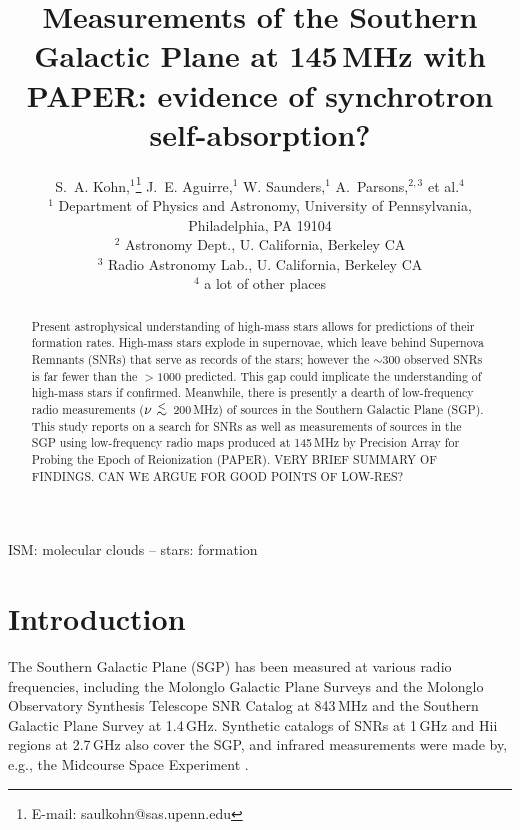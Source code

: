\documentclass[useAMS,usenatbib]{mn2e}
\title[The SGP at 145\,MHz with PAPER]{Measurements of the Southern Galactic Plane at 145\,MHz with PAPER: evidence of synchrotron self-absorption?}
\author[S. A. Kohn et al.]{S.~A. Kohn,$^{1}$\thanks{E-mail: saulkohn@sas.upenn.edu} J.~E. Aguirre,$^{1}$ W. Saunders,$^{1}$
A.~Parsons,$^{2,3}$
\newauthor et al.$^4$\\
$^{1}$ Department of Physics and Astronomy, University of Pennsylvania, Philadelphia, PA 19104\\
$^{2}$ Astronomy Dept., U. California, Berkeley CA\\
$^{3}$ Radio Astronomy Lab., U. California, Berkeley CA\\
$^{4}$ a lot of other places\\
}
\newcommand {\aplt} {\ {\raise-.5ex\hbox{$\buildrel<\over\sim$}}\ }
\begin{document}
\date{}

\maketitle
\begin{abstract}
Present astrophysical understanding of high-mass stars allows for predictions of their formation rates.  High-mass stars explode in supernovae, which leave behind Supernova Remnants (SNRs) that serve as records of the stars; however the $\sim$300 observed SNRs is far fewer than the $>1000$ predicted.  This gap could implicate the understanding of high-mass stars if confirmed. 
Meanwhile, there is presently a dearth of low-frequency radio measurements ($\nu\aplt$200\,MHz) of sources in the Southern Galactic Plane (SGP).
This study reports on a search for SNRs as well as measurements of sources in the SGP using low-frequency radio maps produced at 145\,MHz by Precision Array for Probing the Epoch of Reionization (PAPER).
{\color{red} VERY BRIEF SUMMARY OF FINDINGS.}
{\color{blue} CAN WE ARGUE FOR GOOD POINTS OF LOW-RES?}
\end{abstract}

\begin{keywords}
ISM: molecular clouds -- stars: formation
\end{keywords}

\section{Introduction}

The Southern Galactic Plane (SGP) has been measured at various radio frequencies, including the Molonglo Galactic Plane Surveys \citep[MGPS-1 and 2;][]{Green.99,Murphy.07} and the Molonglo Observatory Synthesis Telescope SNR Catalog \citep[MOSTSNRCAT;][]{Whiteoak.96} at 843\,MHz and the Southern Galactic Plane Survey \citep[SGPS;][]{Haverkorn.06} at 1.4\,GHz. Synthetic catalogs of SNRs at 1\,GHz \citep{DAGreen.14} and H{\sc ii} regions at 2.7\,GHz \citep{Paladini.03} also cover the SGP, and infrared measurements were made by, e.g., the Midcourse Space Experiment \citep[MSX;][operating at 8.28--21.3\,$\mu$m (36.23--14.08\,THz)]{Egan.03}. 
\end{document}
